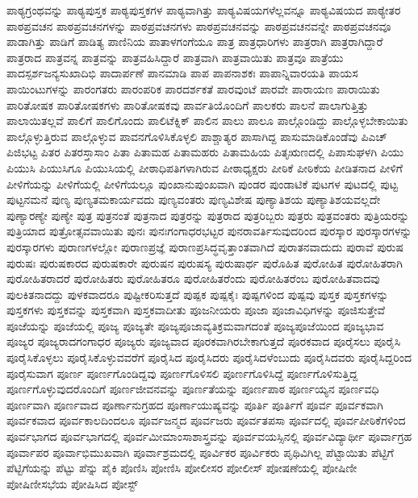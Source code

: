 {ಪಾಠ್ಯಗ್ರಂಥವನ್ನು
ಪಾಠ್ಯಪುಸ್ತಕ
ಪಾಠ್ಯಪುಸ್ತಕಗಳ
ಪಾಠ್ಯವಾಗಿತ್ತು
ಪಾಠ್ಯವಿಷಯಗಳೆಲ್ಲವನ್ನೂ
ಪಾಠ್ಯವಿಷಯದ
ಪಾಠ್ಯೇತರ
ಪಾಠಪ್ರವಚನ
ಪಾಠಪ್ರವಚನಗಳನ್ನು
ಪಾಠಪ್ರವಚನಗಳು
ಪಾಠಪ್ರವಚನವನ್ನು
ಪಾಠಪ್ರವಚನವನ್ನೇ
ಪಾಠಪ್ರವಚನವೂ
ಪಾಡಾಗಿತ್ತು
ಪಾಡಿಗೆ
ಪಾಡಿತ್ಯ
ಪಾಣಿನಿಯ
ಪಾತಾಳಗಂಗೆಯೂ
ಪಾತ್ರ
ಪಾತ್ರಧಾರಿಗಳು
ಪಾತ್ರರಾಗಿ
ಪಾತ್ರರಾಗಿದ್ದಾರೆ
ಪಾತ್ರರಾದ
ಪಾತ್ರವನ್ನ
ಪಾತ್ರವನ್ನು
ಪಾತ್ರವಹಿಸಿದ್ದಾರೆ
ಪಾತ್ರವಾಗಿ
ಪಾತ್ರವಾಯಿತು
ಪಾತ್ರವೂ
ಪಾತ್ರೆಯು
ಪಾದಸ್ಪರ್ಶಜನ್ಯಸುಖಾದಿಭಿ
ಪಾದಾರ್ಪಣೆ
ಪಾನಮಾಡಿ
ಪಾಪ
ಪಾಪನಾಶಕಃ
ಪಾಪಾನ್ನಿವಾರಯತಿ
ಪಾಯಸ
ಪಾಯಿಂಟುಗಳನ್ನು
ಪಾರಂಗತರು
ಪಾರಂಪರಿಕ
ಪಾರದರ್ಶಕತೆ
ಪಾರವುಂಟೆ
ಪಾರವೇ
ಪಾರಾಯಣ
ಪಾರಾಯಿತು
ಪಾರಿತೋಷಕ
ಪಾರಿತೋಷಕಗಳು
ಪಾರಿತೋಷಕವು
ಪಾರ್ವತಿಯೊಂದಿಗೆ
ಪಾಲಕರು
ಪಾಲನೆ
ಪಾಲಾಗುತ್ತಿತ್ತು
ಪಾಲಾಯಿತಲ್ಲವೆ
ಪಾಲಿಗೆ
ಪಾಲಿಗೊಂದು
ಪಾಲಿಟೆಕ್ನಿಕ್
ಪಾಲಿನ
ಪಾಲು
ಪಾಲೂ
ಪಾಲ್ಗೊಂಡಿದ್ದು
ಪಾಲ್ಗೊಳ್ಳಬೇಕಾಯಿತು
ಪಾಲ್ಗೊಳ್ಳುತ್ತಿರುವ
ಪಾಲ್ಗೊಳ್ಳುವ
ಪಾವನಗೊಳಿಸಿಕೊಳ್ಳಲಿ
ಪಾಶ್ಚಾತ್ಯರ
ಪಾಸಾಗಿದ್ದ
ಪಾಸುಮಾಡಿಕೊಂಡೆವು
ಪಿಎಚ್
ಪಿಜಿಭಟ್ಟ
ಪಿತರ
ಪಿತರಸ್ತಾಸಾಂ
ಪಿತಾ
ಪಿತಾಮಹ
ಪಿತಾಮಹರು
ಪಿತಾಮಹಿಯ
ಪಿತೃಋಣದಲ್ಲಿ
ಪಿಪಾಸುಘಳಗಿ
ಪಿಯು
ಪಿಯುಸಿ
ಪಿಯುಸಿಗೂ
ಪಿಯುಸಿಯಲ್ಲಿ
ಪೀಠಾಧಿಪತಿಗಳಾಗಿರುವ
ಪೀಠಾಧ್ಯಕ್ಷರು
ಪೀಠಿಕೆ
ಪೀಠಿಕೆಯ
ಪೀಡಿತನಾದ
ಪೀಳಿಗೆ
ಪೀಳಿಗೆಯನ್ನು
ಪೀಳಿಗೆಯಲ್ಲಿ
ಪೀಳಿಗೆಯಲ್ಲೂ
ಪುಂಖಾನುಪುಂಖವಾಗಿ
ಪುಂಡರ
ಪುಂಡಾಟಿಕೆ
ಪುಟಗಳ
ಪುಟದಲ್ಲಿ
ಪುಟ್ಟ
ಪುಟ್ಟನಮನೆ
ಪುಣ್ಯ
ಪುಣ್ಯತಮಕಾರ್ಯವದು
ಪುಣ್ಯವಂತರು
ಪುಣ್ಯವಿಶೇಷ
ಪುಣ್ಯಾತಿಶಯ
ಪುಣ್ಯಾತಿಶಯವಲ್ಲದೇ
ಪುಣ್ಯಾರಣ್ಯೇ
ಪುಣ್ಯೇ
ಪುತ್ರ
ಪುತ್ರನಂತೆ
ಪುತ್ರನಾದ
ಪುತ್ರರನ್ನು
ಪುತ್ರರಾದ
ಪುತ್ರರಿಬ್ಬರು
ಪುತ್ರರು
ಪುತ್ರವಂತರು
ಪುತ್ರಿಯರನ್ನು
ಪುತ್ರಿಯಾದ
ಪುತ್ರೋತ್ಸವವಾಯಿತು
ಪುನಃ
ಪುನಃಗಂಗಾಧರಭಟ್ಟರ
ಪುನರಾವರ್ತಿಸುವುದರಿಂದ
ಪುರಸ್ಕಾರ
ಪುರಸ್ಕಾರಗಳನ್ನು
ಪುರಸ್ಕಾರಗಳು
ಪುರಾಣಗಳಲ್ಲೋ
ಪುರಾಣಪ್ರಜ್ಞೆ
ಪುರಾಣಪ್ರಸಿದ್ಧವೃತ್ತಾಂತವಾಗಿದೆ
ಪುರಾತನವಾದುದು
ಪುರಾವೆ
ಪುರುಷ
ಪುರುಷಃ
ಪುರುಷಕಾರದ
ಪುರುಷಕಾರೇ
ಪುರುಷನ
ಪುರುಷಸ್ಯ
ಪುರುಷಾರ್ಥ
ಪುರೊಹಿತ
ಪುರೋಹಿತ
ಪುರೋಹಿತರಾಗಿ
ಪುರೋಹಿತರಾದರೆ
ಪುರೋಹಿತರು
ಪುರೋಹಿತರೂ
ಪುರೋಹಿತರೆಂದು
ಪುರೋಹಿತರೆಂಬ
ಪುರೋಹಿತವಾದವು
ಪುಲಕಿತನಾದದ್ದು
ಪುಳಕವಾದರೂ
ಪುಷ್ಟೀಕರಿಸುತ್ತದೆ
ಪುಷ್ಪಕ
ಪುಷ್ಪಕೈಃ
ಪುಷ್ಪಗಳಿಂದ
ಪುಷ್ಪವು
ಪುಸ್ತಕ
ಪುಸ್ತಕಗಳನ್ನು
ಪುಸ್ತಕಗಳು
ಪುಸ್ತಕವನ್ನು
ಪುಸ್ತಕವಾಗಿ
ಪುಸ್ತಕವಾದೀತು
ಪೂಜನೀಯರು
ಪೂಜಾ
ಪೂಜಾವಿಧಿಗಳನ್ನು
ಪೂಜಿಸುತ್ತೇವೆ
ಪೂಜೆಯನ್ನು
ಪೂಜೆಯಲ್ಲಿ
ಪೂಜ್ಯ
ಪೂಜ್ಯತೇ
ಪೂಜ್ಯಪೂಜಾವ್ಯತಿಕ್ರಮವಾಗದಂತೆ
ಪೂಜ್ಯಪೂಜೆಯಿಂದ
ಪೂಜ್ಯಭಾವ
ಪೂಜ್ಯರ
ಪೂಜ್ಯರಾದಗಂಗಾಧರ
ಪೂಜ್ಯರು
ಪೂಜ್ಯವಾದ
ಪೂರಕವಾಗಿರಬೇಕಾಗುತ್ತದೆ
ಪೂರಕವಾದ
ಪೂರೈಸಲು
ಪೂರೈಸಿ
ಪೂರೈಸಿಕೊಳ್ಳಲು
ಪೂರೈಸಿಕೊಳ್ಳುವವರೆಗೆ
ಪೂರೈಸಿದ
ಪೂರೈಸಿದರು
ಪೂರೈಸಿದಳೆಂಬುದು
ಪೂರೈಸಿದವರು
ಪೂರೈಸಿದ್ದರಿಂದ
ಪೂರೈಸುವಾಗ
ಪೂರ್ಣ
ಪೂರ್ಣಗೊಂಡಿದ್ದವು
ಪೂರ್ಣಗೊಳಿಸಲಿ
ಪೂರ್ಣಗೊಳಿಸಿದ್ದೆ
ಪೂರ್ಣಗೊಳಿಸುತ್ತಿದ್ದ
ಪೂರ್ಣಗೊಳ್ಳುವುದರೊಂದಿಗೆ
ಪೂರ್ಣಜೀವನವನ್ನು
ಪೂರ್ಣತೆಯನ್ನು
ಪೂರ್ಣಪಾಠ
ಪೂರ್ಣಯ್ಯನ
ಪೂರ್ಣವಧಿ
ಪೂರ್ಣವಾಗಿ
ಪೂರ್ಣವಾದ
ಪೂರ್ಣಾನುಗ್ರಹದ
ಪೂರ್ಣಾಯುಷ್ಯವನ್ನು
ಪೂರ್ತಿ
ಪೂರ್ತಿಗೆ
ಪೂರ್ವ
ಪೂರ್ವಕವಾಗಿ
ಪೂರ್ವಕವಾದ
ಪೂರ್ವಕಾಲದಿಂದಲೂ
ಪೂರ್ವಜನ್ಮದ
ಪೂರ್ವಜರು
ಪೂರ್ವತಪಸಾ
ಪೂರ್ವದಲ್ಲಿ
ಪೂರ್ವಪೀಠಿಕೆಗಳಿಂದ
ಪೂರ್ವಭಾಗದ
ಪೂರ್ವಭಾಗದಲ್ಲಿ
ಪೂರ್ವಮೀಮಾಂಸಾಶಾಸ್ತ್ರವನ್ನು
ಪೂರ್ವವಯಸ್ಸಿನಲ್ಲಿ
ಪೂರ್ವವಿದ್ಯಾರ್ಥೀ
ಪೂರ್ವಾಗ್ರಹ
ಪೂರ್ವಾಪರ
ಪೂರ್ವಾಭಿಮುಖವಾಗಿ
ಪೂರ್ವಾಶ್ರಮದಲ್ಲಿ
ಪೂರ್ವಿಕರ
ಪೂರ್ವಿಕರು
ಪೃಥಿವಿಗಿಲ್ಲ
ಪೆಟ್ಟಾಯಿತು
ಪೆಟ್ಟಿಗೆ
ಪೆಟ್ಟಿಗೆಯನ್ನು
ಪೆಟ್ಟು
ಪೆನ್ನು
ಪೈಕಿ
ಪೊಣಿಸಿ
ಪೋಣಿಸಿ
ಪೋಲೀಸರ
ಪೋಲೀಸ್
ಪೋಷಣೆಯಲ್ಲಿ
ಪೋಷಿಣೀ
ಪೋಷಿಣೀಸಭೆಯ
ಪೋಷಿಸಿದ
ಪೋಸ್ಟ್
}
